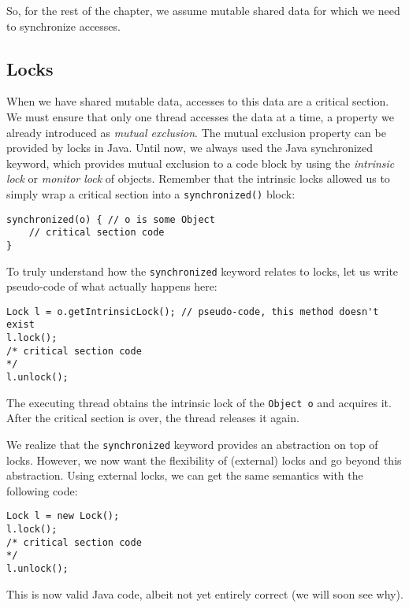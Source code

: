 \documentclass[main.tex]{subfiles}
\begin{document}
\noindent So, for the rest of the chapter, we assume mutable shared data for which we need to synchronize accesses.

\subsection{Locks}
When we have shared mutable data, accesses to this data are a critical section. We must ensure that only one thread accesses the data at a time, a property we already introduced as \textit{mutual exclusion}. The mutual exclusion property can be provided by locks in Java. Until now, we always used the Java synchronized keyword, which provides mutual exclusion to a code block by using the \textit{intrinsic lock} or \textit{monitor lock} of objects. Remember that the intrinsic locks allowed us to simply wrap a critical section into a \texttt{synchronized()} block:

\begin{verbatim}
synchronized(o) { // o is some Object
    // critical section code
}
\end{verbatim}

\noindent To truly understand how the \texttt{synchronized} keyword relates to locks, let us write pseudo-code of what actually happens here:

\begin{verbatim}
Lock l = o.getIntrinsicLock(); // pseudo-code, this method doesn't exist
l.lock();
/* critical section code
*/
l.unlock();
\end{verbatim}

\noindent The executing thread obtains the intrinsic lock of the \texttt{Object o} and acquires it. After the critical section is over, the thread releases it again.

We realize that the \texttt{synchronized} keyword provides an abstraction on top of locks. However, we now want the flexibility of (external) locks and go beyond this abstraction. Using external locks, we can get the same semantics with the following code:

\begin{verbatim}
Lock l = new Lock();
l.lock();
/* critical section code
*/
l.unlock();
\end{verbatim}

\noindent This is now valid Java code, albeit not yet entirely correct (we will soon see why).
\end{document}
